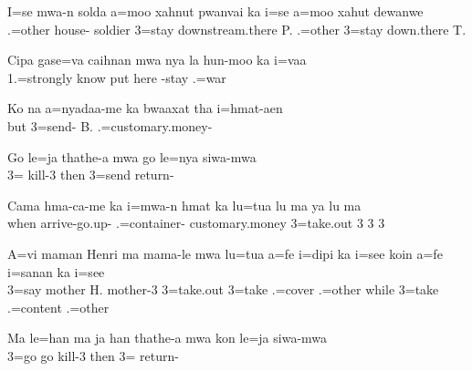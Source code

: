 \gll I=se mwa-n solda a=moo xahnut pwanvai ka i=se a=moo xahut dewanwe \\ 
.=other house- soldier 3=stay downstream.there P.  .=other 3=stay down.there T.\\
 \glt {}
\z 

\ea
\gll Cipa gase=va caihnan mwa nya la hun-moo ka i=vaa \\
 1.=strongly know  put here -stay  .=war\\ 
\glt {}
\z 

\ea
\gll Ko na a=nyadaa-me ka bwaaxat tha i=hmat-aen \\ but  3=send-  B.  .=customary.money- \\ \glt {}
 \z 
 
 \ea\label{ex:thathe2}
\gll Go le=ja thathe-a mwa go le=nya siwa-mwa\\  3= kill-3  then 3=send return-\\ \glt {}
 \z 

\ea
\gll Cama hma-ca-me ka i=mwa-n hmat ka lu=tua lu ma ya lu ma\\ when arrive-go.up-  .=container- customary.money  3=take.out 3  3 3 \\ \glt {}%
\z 

\ea
\gll A=vi maman Henri ma mama-le mwa lu=tua a=fe i=dipi ka i=see koin a=fe i=sanan ka i=see \\ 3=say mother H.  mother-3  3=take.out 3=take .=cover  .=other while 3=take .=content  .=other \\ \glt  {}
\z 

\ea\label{ex:thathe3}
\gll Ma le=han ma ja han thathe-a mwa kon le=ja siwa-mwa \\  3=go   go kill-3  then 3= return-\\ \glt {}
\z 

